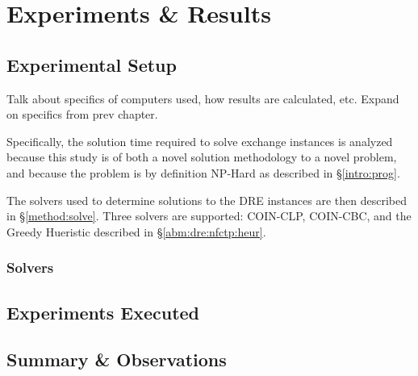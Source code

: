 \chapter{Experiments \& Results}\label{ch:results}

\section{Experimental Setup}

Talk about specifics of computers used, how results are calculated, etc. Expand on specifics from prev chapter.

Specifically, the solution
time required to solve exchange instances is analyzed because this study is of
both a novel solution methodology to a novel problem, and because the problem is
by definition NP-Hard as described in \S \ref{intro:prog}.

The solvers used to determine solutions to the DRE instances are then described
in \S \ref{method:solve}. Three solvers are supported: COIN-CLP, COIN-CBC, and
the Greedy Hueristic described in \S \ref{abm:dre:nfctp:heur}.

\subsection{Solvers}\label{method:setup:solve}


\section{Experiments Executed}

\section{Summary \& Observations}
